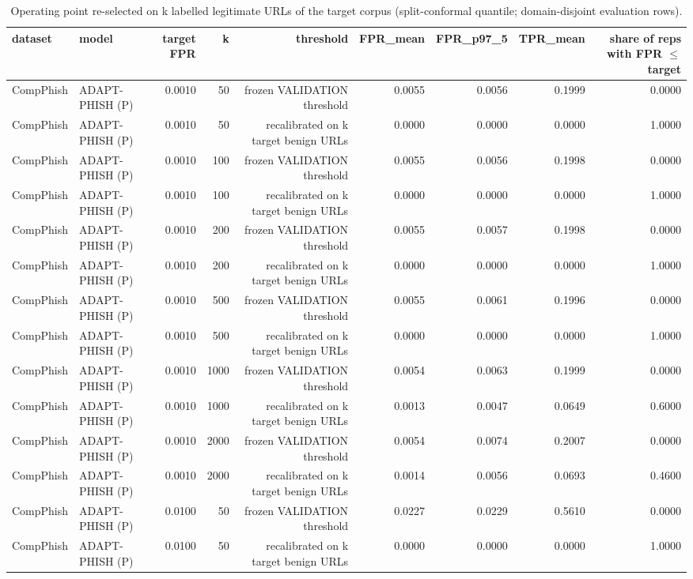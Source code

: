 \begin{table}[t]
\centering
\scriptsize
\caption{Operating point re-selected on k labelled legitimate URLs of the target corpus (split-conformal quantile; domain-disjoint evaluation rows).}
\label{tab:rev_R6_target_domain_recalibration}
\begin{tabular}{llrrrrrrr}
\toprule
dataset & model & target FPR & k & threshold & FPR\_mean & FPR\_p97\_5 & TPR\_mean & share of reps with FPR $\leq$ target \\
\midrule
CompPhish & ADAPT-PHISH (P) & 0.0010 & 50 & frozen VALIDATION threshold & 0.0055 & 0.0056 & 0.1999 & 0.0000 \\
CompPhish & ADAPT-PHISH (P) & 0.0010 & 50 & recalibrated on k target benign URLs & 0.0000 & 0.0000 & 0.0000 & 1.0000 \\
CompPhish & ADAPT-PHISH (P) & 0.0010 & 100 & frozen VALIDATION threshold & 0.0055 & 0.0056 & 0.1998 & 0.0000 \\
CompPhish & ADAPT-PHISH (P) & 0.0010 & 100 & recalibrated on k target benign URLs & 0.0000 & 0.0000 & 0.0000 & 1.0000 \\
CompPhish & ADAPT-PHISH (P) & 0.0010 & 200 & frozen VALIDATION threshold & 0.0055 & 0.0057 & 0.1998 & 0.0000 \\
CompPhish & ADAPT-PHISH (P) & 0.0010 & 200 & recalibrated on k target benign URLs & 0.0000 & 0.0000 & 0.0000 & 1.0000 \\
CompPhish & ADAPT-PHISH (P) & 0.0010 & 500 & frozen VALIDATION threshold & 0.0055 & 0.0061 & 0.1996 & 0.0000 \\
CompPhish & ADAPT-PHISH (P) & 0.0010 & 500 & recalibrated on k target benign URLs & 0.0000 & 0.0000 & 0.0000 & 1.0000 \\
CompPhish & ADAPT-PHISH (P) & 0.0010 & 1000 & frozen VALIDATION threshold & 0.0054 & 0.0063 & 0.1999 & 0.0000 \\
CompPhish & ADAPT-PHISH (P) & 0.0010 & 1000 & recalibrated on k target benign URLs & 0.0013 & 0.0047 & 0.0649 & 0.6000 \\
CompPhish & ADAPT-PHISH (P) & 0.0010 & 2000 & frozen VALIDATION threshold & 0.0054 & 0.0074 & 0.2007 & 0.0000 \\
CompPhish & ADAPT-PHISH (P) & 0.0010 & 2000 & recalibrated on k target benign URLs & 0.0014 & 0.0056 & 0.0693 & 0.4600 \\
CompPhish & ADAPT-PHISH (P) & 0.0100 & 50 & frozen VALIDATION threshold & 0.0227 & 0.0229 & 0.5610 & 0.0000 \\
CompPhish & ADAPT-PHISH (P) & 0.0100 & 50 & recalibrated on k target benign URLs & 0.0000 & 0.0000 & 0.0000 & 1.0000 \\

\end{tabular}
\end{table}

